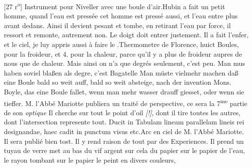                 \vspace*{8mm}
                \pstart 
                \normalsize
            [27 r\textsuperscript{o}] Instrument pour Niveller\protect{} avec une boule d'air.\pend \pstart Hubin\protect{} a fait un petit homme, quand l'eau est press\'{e}e  cet homme est press\'{e} aussi, et l'eau entre plus avant  dedans. Ainsi il devient pesant et tombe, en retirant l'eau par  force, il ressort et remonte, autrement non. Le doigt doit entrer justement.  Il a fait l'enfer, et le ciel, je luy appris aussi  \`{a} faire le .\pend \pstart Thermometre de Florence\protect{}, huict Boules, pour la froideur, et 4. pour la chaleur\protect{}, parce qu'il y a plus de froideur\protect{} aupres de nous que de chaleur\protect{}. Mais ainsi on n'a que  degr\'{e}s seulement, c'est peu.  Man mus haben soviel blaßen als degre, c'est Bagatelle  Man m\"{u}ste vielmehr machen daß eine Boule bald so weit auff, bald so weit absteige, nach der invention Mons. Boyle\protect{}, das eine Boule fallet, wenn man mehr wasser drauff giesset, oder wenn sie tieffer. M. l'Abb\'{e} Mariotte\protect{} publiera un trait\'{e} de perspective\protect{}, ce sera la 7\textsuperscript{me} partie de son \textit{optique} Il cherche sur tout le point d'oil \textit{[!]}, dont il tire toutes les autres, dont l'intersection represente tout. Ducit in Tabulam lineam parallelam lineis rei  designandae, haec cadit in punctum visus etc.\pend \pstart Arc en ciel\protect{}  de M. l'Abb\'{e} Mariotte. Il sera publi\'{e} bien tost. Il y rend raison de tout par des Experiences. Il prend un tuyau de verre met au bas du vif argent\protect{} sur cela du papier sur le papier de l'eau, le rayon  tombant sur le papier le peint en divers couleurs\protect{}, 